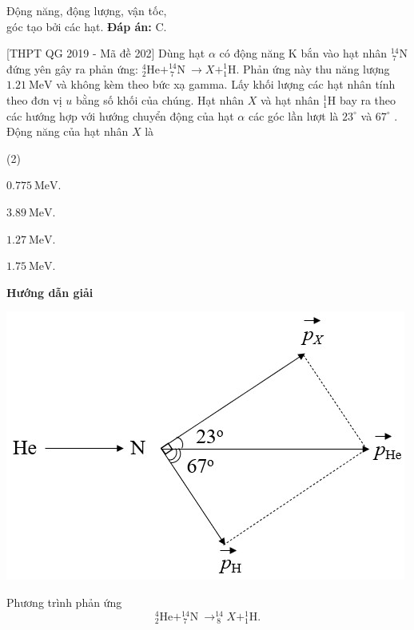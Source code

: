 \begin{dang}{Động năng, động lượng, vận tốc,\\ góc tạo bởi các hạt.}
{\textbf{Đáp án:} C.}
		
		{
		[THPT QG 2019 - Mã đề 202] Dùng hạt $\alpha$  có động năng K bắn vào hạt nhân  $^{14}_{\ 7}\text{N}$ đứng yên gây ra phản ứng: $^4_2\text{He} + ^{14}_{\ 7}\text{N}\ \rightarrow X + ^1_1\text{H}$. Phản ứng này thu năng lượng $\SI{1,21}{\mega\electronvolt}$ và không kèm theo bức xạ gamma. Lấy khối lượng các hạt nhân tính theo đơn vị $u$ bằng số khối của chúng. Hạt nhân $X$ và hạt nhân $^1_1\text{H}$  bay ra theo các hướng hợp với hướng chuyển động của hạt $\alpha$  các góc lần lượt là $23^\circ$ và $67^\circ$ . Động năng của hạt nhân $X$ là
		
		\begin{mcq}(2)
			\item $\SI{0,775}{\mega\electronvolt}$.
			\item $\SI{3,89}{\mega\electronvolt}$.
			\item $\SI{1,27}{\mega\electronvolt}$.
			\item $\SI{1,75}{\mega\electronvolt}$.
		\end{mcq}}
		{
		\begin{center}
			\textbf{Hướng dẫn giải}
		\end{center}
		
		\begin{center}
			\includegraphics[scale=0.8]{../figs/VN12-PH-47-L-028-2-H2.jpg}
		\end{center}
	
		Phương trình phản ứng
		\begin{equation*}
		^4_2\text{He} + ^{14}_{\ 7}\text{N}\ \rightarrow ^{14}_{\ 8} X + ^1_1\text{H}.
		\end{equation*}
		 
}
\end{dang}
